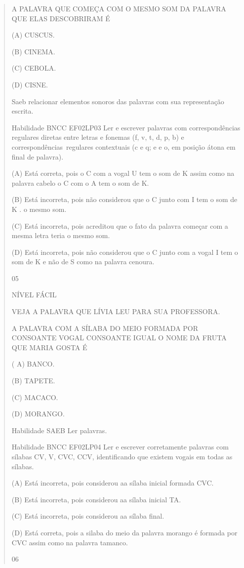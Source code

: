 {{{{\begin{verse}
{{\begin{escolha}
{{{{{A PALAVRA QUE COMEÇA COM O MESMO SOM DA PALAVRA QUE ELAS DESCOBRIRAM É

(A) CUSCUS.

(B) CINEMA.

(C) CEBOLA.

(D) CISNE.

Saeb relacionar elementos sonoros das palavras com sua representação
escrita.

Habilidade BNCC EF02LP03 Ler e escrever palavras com correspondências
regulares diretas entre letras e fonemas (f, v, t, d, p, b) e
correspondências~regulares contextuais (c e q; e e o, em posição átona
em final de palavra).

(A) Está correta, pois o C com a vogal U tem o som de K assim como na
palavra cabelo o C com o A tem o som de K.

(B) Está incorreta, pois não considerou que o C junto com I tem o som de
K . o mesmo som.

(C) Está incorreta, pois acreditou que o fato da palavra começar com a
mesma letra teria o mesmo som.

(D) Está incorreta, pois não considerou que o C junto com a vogal I tem
o som de K e não de S como na palavra cenoura.

\num{05}

NÍVEL FÁCIL

VEJA A PALAVRA QUE LÍVIA LEU PARA SUA PROFESSORA.

A PALAVRA COM A SÍLABA DO MEIO FORMADA POR CONSOANTE VOGAL CONSOANTE
IGUAL O NOME DA FRUTA QUE MARIA GOSTA É

( A) BANCO.

(B) TAPETE.

(C) MACACO.

(D) MORANGO.

Habilidade SAEB Ler palavras.

Habilidade BNCC EF02LP04 Ler e escrever corretamente palavras com
sílabas CV, V, CVC, CCV, identificando que existem vogais em todas as
sílabas.

(A) Está incorreta, pois considerou aa sílaba inicial formada CVC.

(B) Está incorreta, pois considerou aa sílaba inicial TA.

(C) Está incorreta, pois considerou aa sílaba final.

(D) Está correta, pois a silaba do meio da palavra morango é formada por
CVC assim como na palavra tamanco.

\num{06}

}}}}}
\end{escolha}}}
\end{verse}}}}}
